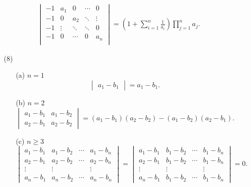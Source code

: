 \documentclass{article}
\begin{document}
\begin{enumerate}
\begin{enumerate}
\begin{align*}
\begin{vmatrix}
                   -1 &   a_1 &     0 & \cdots&      0\\
                   -1 &     0 &   a_2 & \ddots& \vdots\\  
                   -1 & \vdots& \ddots& \ddots&      0\\
                   -1 &     0 & \cdots&     0 &    a_n\\
                \end{vmatrix}
                =
                \left(1+\sum\limits_{i=1}^n \frac{1}{a_i}\right)\prod\limits_{j=1}^n a_j.
        \end{align*}
        \item [(8)]
        \begin{enumerate}
            \item [(a)]$n=1$ \[\begin{vmatrix} a_1-b_1 \end{vmatrix}=a_1-b_1.\]
            \item [(b)]$n=2$ 
            \[
                \begin{vmatrix}
                    a_1-b_1 & a_1-b_2\\
                    a_2-b_1 & a_2-b_2
                \end{vmatrix}
                =(a_1-b_1)(a_2-b_2)-(a_1-b_2)(a_2-b_1).
            \]
            \item [(c)]$n\geq 3$
            \[
                \begin{vmatrix}
                    a_1-b_1 & a_1-b_2 & \cdots & a_1-b_n\\
                    a_2-b_1 & a_2-b_2 & \cdots & a_2-b_n\\
                    \vdots  & \vdots  &        & \vdots \\
                    a_n-b_1 & a_n-b_2 & \cdots & a_n-b_n
                \end{vmatrix}
                =
                \begin{vmatrix}
                    a_1-b_1 & b_1-b_2 & \cdots & b_1-b_n\\
                    a_2-b_1 & b_1-b_2 & \cdots & b_1-b_n\\
                    \vdots  & \vdots  &        & \vdots \\
                    a_n-b_1 & b_1-b_2 & \cdots & b_1-b_n
                \end{vmatrix}
                =0.
            \]
        \end{enumerate}
    \end{enumerate}
\end{enumerate}
\end{document}

